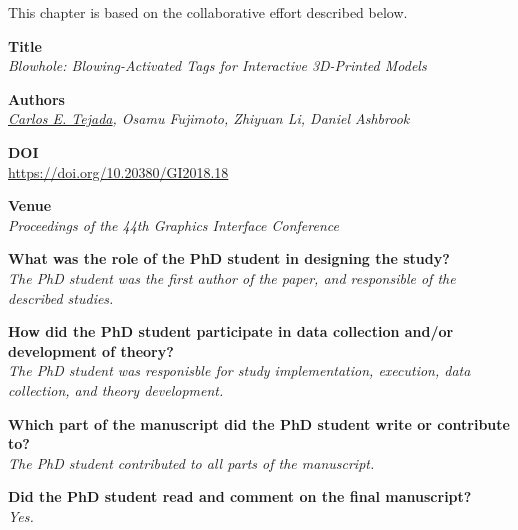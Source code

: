   This chapter is based on the collaborative effort described below.

  \vfill

  \noindent
  \textbf{Title}\\
  \textit{Blowhole: Blowing-Activated Tags for Interactive 3D-Printed Models}

  \bigskip

  \noindent
  \textbf{Authors}\\
  \textit{\underline{Carlos E. Tejada}, Osamu Fujimoto, Zhiyuan Li, Daniel Ashbrook}

  \bigskip

  \noindent
  \textbf{DOI}\\
  \href{https://doi.org/10.20380/GI2018.18}{https://doi.org/10.20380/GI2018.18}


  \bigskip

  \noindent
  \textbf{Venue}\\
  \textit{Proceedings of the 44th Graphics Interface Conference}


  \bigskip

	\noindent
	\textbf{What was the role of the PhD student in designing the study?}\\
  \textit{The PhD student was the first author of the paper, and responsible
    of the described studies.}

	\bigskip

	\noindent
	\textbf{How did the PhD student participate in data collection and/or development of theory?}\\
  \textit{The PhD student was responisble for study implementation, execution,
    data collection, and theory development.}

	\bigskip

	\noindent
	\textbf{Which part of the manuscript did the PhD student write or contribute to?}\\
  \textit{The PhD student contributed to all parts of the manuscript.}

	\bigskip

	\noindent
	\textbf{Did the PhD student read and comment on the final manuscript?}\\
	\textit{Yes.}

  \bigskip
  \vfill

  \newpage

